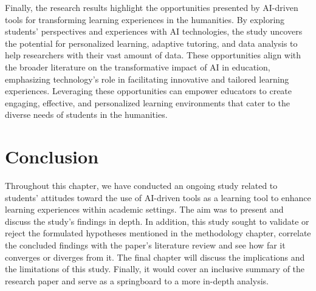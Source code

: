 Finally, the research results highlight the opportunities presented
by AI-driven tools for transforming learning experiences in the humanities.
By exploring students' perspectives and experiences with AI technologies,
the study uncovers the potential for personalized learning, adaptive tutoring,
and data analysis to help researchers with their vast amount of data.
These opportunities align with the broader literature on the transformative
impact of AI in education, emphasizing technology's role in facilitating
innovative and tailored learning experiences. Leveraging these opportunities
can empower educators to create engaging, effective, and personalized learning
environments that cater to the diverse needs of students in the humanities.
\section{Conclusion}

Throughout this chapter, we have conducted an ongoing study related to
students' attitudes toward the use of AI-driven tools as a learning
tool to enhance learning experiences within academic settings. The
aim was to present and discuss the study's findings in depth.
In addition, this study sought to validate or reject the formulated
hypotheses mentioned in the methodology chapter, correlate the
concluded findings with the paper's literature review and see
how far it converges or diverges from it. The final chapter
will discuss the implications and the limitations of this
study. Finally, it would cover an inclusive summary of the
research paper and serve as a springboard to a more in-depth analysis.

 
